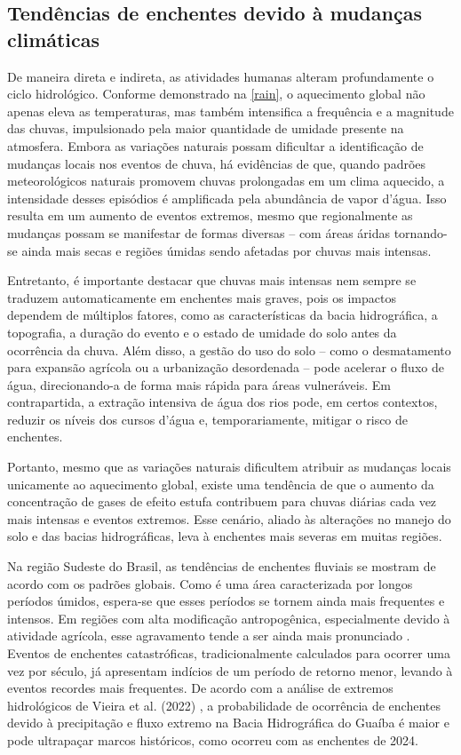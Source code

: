 \subsection{Tendências de enchentes devido à mudanças climáticas}
De maneira direta e indireta, as atividades humanas alteram profundamente o ciclo hidrológico. Conforme demonstrado na
\autoref{rain}, o aquecimento global não apenas eleva as temperaturas, mas também intensifica a frequência e a magnitude
das chuvas, impulsionado pela maior quantidade de umidade presente na atmosfera. Embora as variações naturais possam
dificultar a identificação de mudanças locais nos eventos de chuva, há evidências de que, quando padrões meteorológicos
naturais promovem chuvas prolongadas em um clima aquecido, a intensidade desses episódios é amplificada pela abundância
de vapor d’água. Isso resulta em um aumento de eventos extremos, mesmo que regionalmente as mudanças possam se
manifestar de formas diversas – com áreas áridas tornando-se ainda mais secas e regiões úmidas sendo afetadas por chuvas
mais intensas.

Entretanto, é importante destacar que chuvas mais intensas nem sempre se traduzem automaticamente em enchentes mais
graves, pois os impactos dependem de múltiplos fatores, como as características da bacia hidrográfica, a topografia, a
duração do evento e o estado de umidade do solo antes da ocorrência da chuva. Além disso, a gestão do uso do solo – como
o desmatamento para expansão agrícola ou a urbanização desordenada – pode acelerar o fluxo de água, direcionando-a de
forma mais rápida para áreas vulneráveis. Em contrapartida, a extração intensiva de água dos rios pode, em certos
contextos, reduzir os níveis dos cursos d’água e, temporariamente, mitigar o risco de enchentes.

Portanto, mesmo que as variações naturais dificultem atribuir as mudanças locais unicamente ao aquecimento global,
existe uma tendência de que o aumento da concentração de gases de efeito estufa contribuem para chuvas diárias cada vez
mais intensas e eventos extremos. Esse cenário, aliado às alterações no manejo do solo e das bacias hidrográficas, leva
à enchentes mais severas em muitas regiões.

Na região Sudeste do Brasil, as tendências de enchentes fluviais se mostram de acordo com os padrões globais. Como é uma
área caracterizada por longos períodos úmidos, espera-se que esses períodos se tornem ainda mais frequentes e intensos.
Em regiões com alta modificação antropogênica, especialmente devido à atividade agrícola, esse agravamento tende a ser
ainda mais pronunciado \cite{chagas}. Eventos de enchentes catastróficas, tradicionalmente calculados para ocorrer uma
vez por século, já apresentam indícios de um período de retorno menor, levando à eventos recordes mais frequentes. De
acordo com a análise de extremos hidrológicos de Vieira et al. (2022) \cite{vieira}, a probabilidade de ocorrência de
enchentes devido à precipitação e fluxo extremo na Bacia Hidrográfica do Guaíba é maior e pode ultrapaçar marcos
históricos, como ocorreu com as enchentes de 2024.

